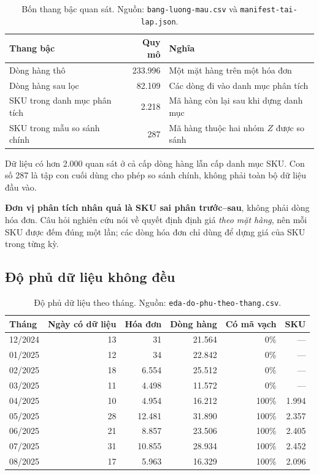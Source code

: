 \documentclass[11pt]{article}
\begin{document}
\begin{table}[htbp]
  \centering
  \caption{Bốn thang bậc quan sát. Nguồn: \texttt{bang-luong-mau.csv} và
  \texttt{manifest-tai-lap.json}.}
  \label{tab:quy-mo}
  \begin{tabular}{lrl}
    \toprule
    Thang bậc & Quy mô & Nghĩa \\
    \midrule
    Dòng hàng thô              & 233.996 & Một mặt hàng trên một hóa đơn \\
    Dòng hàng sau lọc          & 82.109  & Các dòng đi vào danh mục phân tích \\
    SKU trong danh mục phân tích & 2.218 & Mã hàng còn lại sau khi dựng danh mục \\
    SKU trong mẫu so sánh chính  & 287   & Mã hàng thuộc hai nhóm $Z$ được so sánh \\
    \bottomrule
  \end{tabular}
\end{table}

Dữ liệu có hơn 2.000 quan sát ở cả cấp dòng hàng lẫn cấp danh mục SKU. Con số 287 là tập con cuối
dùng cho phép so sánh chính, không phải toàn bộ dữ liệu đầu vào.

\textbf{Đơn vị phân tích nhân quả là SKU sai phân trước--sau}, không phải dòng hóa đơn. Câu hỏi
nghiên cứu nói về quyết định định giá \emph{theo mặt hàng}, nên mỗi SKU được đếm đúng một lần; các
dòng hóa đơn chỉ dùng để dựng giá của SKU trong từng kỳ.

\subsection{Độ phủ dữ liệu không đều}

\begin{table}[htbp]
  \centering
  \caption{Độ phủ dữ liệu theo tháng. Nguồn: \texttt{eda-do-phu-theo-thang.csv}.}
  \label{tab:do-phu}
  \begin{tabular}{lrrrrr}
    \toprule
    Tháng & Ngày có dữ liệu & Hóa đơn & Dòng hàng & Có mã vạch & SKU \\
    \midrule
    12/2024 & 13 & 31     & 21.564 & 0\%   & --- \\
    01/2025 & 12 & 34     & 22.842 & 0\%   & --- \\
    02/2025 & 18 & 6.554  & 25.512 & 0\%   & --- \\
    03/2025 & 11 & 4.498  & 11.572 & 0\%   & --- \\
    04/2025 & 10 & 4.954  & 16.212 & 100\% & 1.994 \\
    05/2025 & 28 & 12.481 & 31.890 & 100\% & 2.357 \\
    06/2025 & 21 & 8.857  & 23.506 & 100\% & 2.405 \\
    07/2025 & 31 & 10.855 & 28.934 & 100\% & 2.452 \\
    08/2025 & 17 & 5.963  & 16.329 & 100\% & 2.096 \\
    \bottomrule
  \end{tabular}
\end{table}
\end{document}
